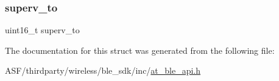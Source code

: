 \subsubsection{\texorpdfstring{superv\_to}{superv\_to}}
{\footnotesize\ttfamily uint16\+\_\+t superv\+\_\+to}



The documentation for this struct was generated from the following file\+:\begin{DoxyCompactItemize}
\item 
A\+S\+F/thirdparty/wireless/ble\+\_\+sdk/inc/\mbox{\hyperlink{at__ble__api_8h}{at\+\_\+ble\+\_\+api.\+h}}\end{DoxyCompactItemize}
